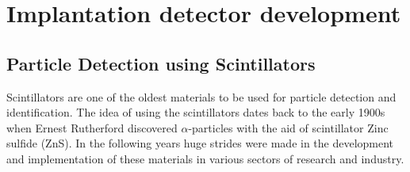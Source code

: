 \chapter{Implantation detector development} \label{ch:yso_detector}

\section{Particle Detection using Scintillators}
Scintillators are one of the oldest materials to be used for particle detection and identification. The idea of using the scintillators dates back to the early 1900s \citep{rutherford} when Ernest Rutherford discovered $\alpha$-particles with the aid of scintillator Zinc sulfide (ZnS). In the following years huge strides were made in the development and implementation of these materials in various sectors of research and industry.\\


